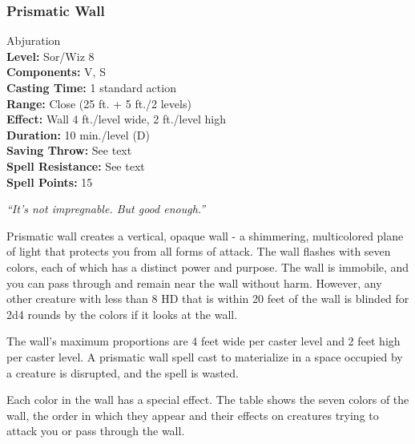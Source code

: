 \subsubsection{Prismatic Wall}
\label{Spell:PrismaticWall}
Abjuration
\\ \textbf{Level:} Sor/Wiz 8
\\ \textbf{Components:} V, S
\\ \textbf{Casting Time:} 1 standard action
\\ \textbf{Range:} Close (25 ft. + 5 ft./2 levels)
\\ \textbf{Effect:} Wall 4 ft./level wide, 2 ft./level high
\\ \textbf{Duration:} 10 min./level (D)
\\ \textbf{Saving Throw:} See text
\\ \textbf{Spell Resistance:} See text
\\ \textbf{Spell Points:} 15

\emph{``It's not impregnable. But good enough.''}

Prismatic wall creates a vertical, opaque wall - a shimmering, 
multicolored plane of light that protects you from all forms of attack. 
The wall flashes with seven colors, each of which has a distinct power and purpose. 
The wall is immobile, and you can pass through and remain near the wall without harm. 
However, any other creature with less than 8 HD that is within 20 feet of the wall is blinded for 2d4 rounds by the colors if it looks at the wall.

The wall's maximum proportions are 4 feet wide per caster level and 2 feet high per caster level. 
A prismatic wall spell cast to materialize in a space occupied by a creature is disrupted, and the spell is wasted.

Each color in the wall has a special effect. 
The  table shows the seven colors of the wall, 
the order in which they appear and their effects on creatures trying to attack you or pass through the wall.%

